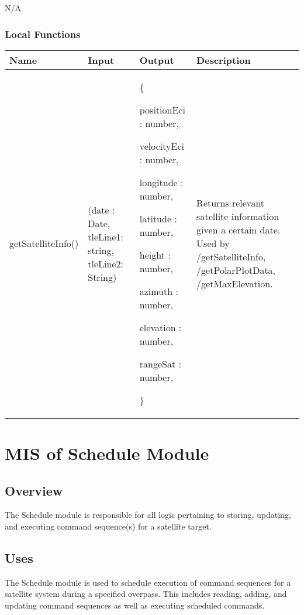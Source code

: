 \documentclass[12pt, titlepage]{article}
\begin{document}
N/A

\subsubsection{Local Functions}
\begin{center}
\begin{tabular}{|p{4cm} |p{3cm} |p{5cm} |p{4cm}|}
\hline
\textbf{Name} & \textbf{Input} & \textbf{Output} & \textbf{Description} \\
\hline
getSatelliteInfo() & (date : Date, tleLine1: string, tleLine2: String) & \{

positionEci : number,

velocityEci : number,

longitude : number,

latitude : number,

height : number,

azimuth : number,

elevation : number,

rangeSat : number,

\} & Returns relevant satellite information given a certain date. Used by /getSatelliteInfo, /getPolarPlotData, /getMaxElevation. \\
\hline
\end{tabular}
\end{center}

 

\section{MIS of {Schedule Module}} \label{Module} 

\subsection{Overview}

The Schedule module is responsible for all logic pertaining to storing, updating, and executing command sequence(s) for a satellite target.

\subsection{Uses}

The Schedule module is used to schedule execution of command sequences for a satellite system during a specified overpass. This includes reading, adding, and updating command sequences as well as executing scheduled commands.
\end{document}
